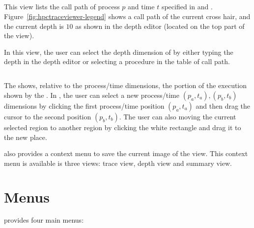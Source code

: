 \subsection{\callview}
\label{sec:callview}


This view lists the call path of process $p$ and time $t$ specified in \traceview{} and \depthview.
Figure~\ref{fig:hpctraceviewer-legend} shows a call path of the current cross hair, and the current depth is $10$ as shown in the depth editor (located on the top part of the view).

In this view, the user can select the depth dimension of \traceview{} by either typing the depth in the depth editor or selecting a procedure in the table of call path.

\subsection{\miniview}
\label{sec:miniview}

The \miniview{} shows, relative to the process/time dimensions, the portion of the execution shown by the \traceview.
In \miniview{}, the user can select a new process/time $(p_a,t_a),(p_b,t_b)$ dimensions by clicking the first process/time position $(p_a,t_a)$ and then drag the cursor to the second position $(p_b,t_b)$.
The user can also moving the current selected region to another region by clicking the white rectangle and drag it to the new place.

\hpctraceviewer{} also provides a context menu to save the current image of the view.
This context menu is available is three views: trace view, depth view and summary view.


\section{Menus}

\hpcviewer{} provides four main menus:


